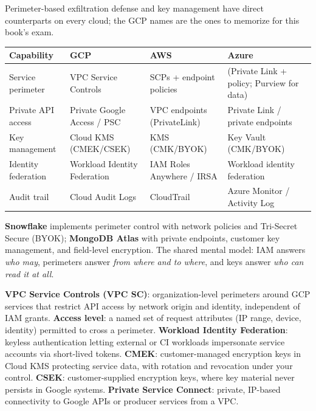 \begin{crosscloud}
Perimeter-based exfiltration defense and key management have direct counterparts on every cloud; the GCP names are the ones to memorize for this book's exam.

\vspace{2mm}
{\footnotesize
\begin{tabular}{@{}p{2.8cm}p{3.0cm}p{3.0cm}p{3.0cm}@{}} \\
\toprule
\textbf{Capability} & \textbf{GCP} & \textbf{AWS} & \textbf{Azure} \\
\midrule
Service perimeter & VPC Service Controls & SCPs + endpoint policies & (Private Link + policy; Purview for data) \\
Private API access & Private Google Access / PSC & VPC endpoints (PrivateLink) & Private Link / private endpoints \\
Key management & Cloud KMS (CMEK/CSEK) & KMS (CMK/BYOK) & Key Vault (CMK/BYOK) \\
Identity federation & Workload Identity Federation & IAM Roles Anywhere / IRSA & Workload identity federation \\
Audit trail & Cloud Audit Logs & CloudTrail & Azure Monitor / Activity Log \\
\bottomrule
\end{tabular}}

\vspace{1mm}
\textbf{Snowflake} implements perimeter control with network policies and Tri-Secret Secure (BYOK); \textbf{MongoDB Atlas} with private endpoints, customer key management, and field-level encryption. The shared mental model: IAM answers \emph{who may}, perimeters answer \emph{from where and to where}, and keys answer \emph{who can read it at all}.
\end{crosscloud}

\begin{keyterms}
\textbf{VPC Service Controls (VPC SC)}: organization-level perimeters around GCP services that restrict API access by network origin and identity, independent of IAM grants.
\textbf{Access level}: a named set of request attributes (IP range, device, identity) permitted to cross a perimeter.
\textbf{Workload Identity Federation}: keyless authentication letting external or CI workloads impersonate service accounts via short-lived tokens.
\textbf{CMEK}: customer-managed encryption keys in Cloud KMS protecting service data, with rotation and revocation under your control.
\textbf{CSEK}: customer-supplied encryption keys, where key material never persists in Google systems.
\textbf{Private Service Connect}: private, IP-based connectivity to Google APIs or producer services from a VPC.
\end{keyterms}

